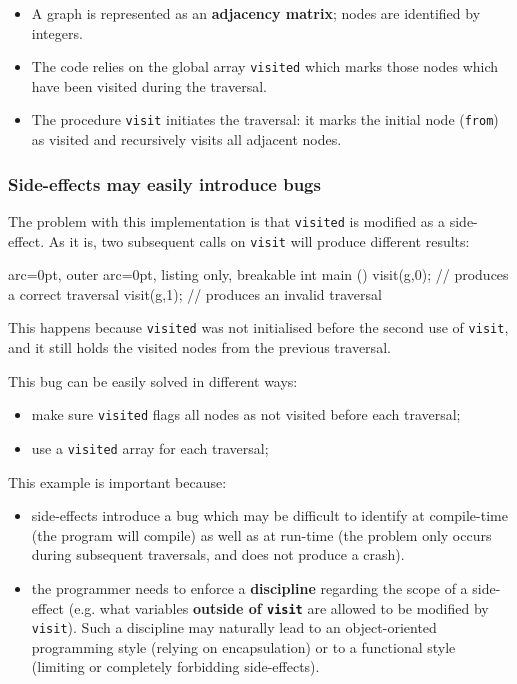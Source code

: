 \begin{itemize}
	\item  A graph is represented as an \textbf{adjacency matrix}; nodes are identified by integers.
	\item  The code relies on the global array \texttt{visited} which marks those nodes which have been visited during the traversal.
	\item  The procedure \texttt{visit} initiates the traversal: it marks the initial node (\texttt{from}) as visited and recursively visits all adjacent nodes. 
\end{itemize}

\subsubsection*{ Side-effects may easily introduce bugs }

The problem with this implementation is that \texttt{visited} is modified as a side-effect. As it is, two subsequent calls on \texttt{visit} will produce different results:


\begin{tcblisting}{ arc=0pt, outer arc=0pt, listing only, breakable}
int main () {
     visit(g,0);  // produces a correct traversal
     visit(g,1);  // produces an invalid traversal
}

\end{tcblisting}


This happens because \texttt{visited} was not initialised before the second use of \texttt{visit}, and it still holds the visited nodes from the previous traversal.

This bug can be easily solved in different ways:
\begin{itemize}
	\item  make sure \texttt{visited} flags all nodes as not visited before each traversal;
	\item  use a \texttt{visited} array for each traversal;
\end{itemize}

This example is important because:
\begin{itemize}
	\item  side-effects introduce a bug which may be difficult to identify at compile-time (the program will compile) as well as at run-time (the problem only occurs during subsequent traversals, and does not produce a crash).
	\item  the programmer needs to enforce a \textbf{discipline} regarding the scope of a side-effect (e.g. what variables \textbf{outside of \texttt{visit}} are allowed to be modified by \texttt{visit}). Such a discipline may naturally lead to an object-oriented programming style (relying on encapsulation) or to a functional style (limiting or completely forbidding side-effects).
\end{itemize}

